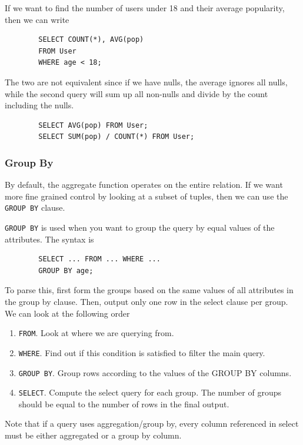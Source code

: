     \begin{example}
      If we want to find the number of users under 18 and their average popularity, then we can write 
      \begin{lstlisting}
        SELECT COUNT(*), AVG(pop) 
        FROM User 
        WHERE age < 18; 
      \end{lstlisting}
    \end{example}

    \begin{example}
      The two are not equivalent since if we have nulls, the average ignores all nulls, while the second query will sum up all non-nulls and divide by the count including the nulls. 
      \begin{lstlisting}
        SELECT AVG(pop) FROM User; 
        SELECT SUM(pop) / COUNT(*) FROM User; 
      \end{lstlisting}
    \end{example}

  \subsubsection{Group By} 

    By default, the aggregate function operates on the entire relation. If we want more fine grained control by looking at a subset of tuples, then we can use the \texttt{GROUP BY} clause. 

    \begin{definition}
      \texttt{GROUP BY} is used when you want to group the query by equal values of the attributes. The syntax is 
      \begin{lstlisting}
        SELECT ... FROM ... WHERE ... 
        GROUP BY age; 
      \end{lstlisting}
      To parse this, first form the groups based on the same values of all attributes in the group by clause. Then, output only one row in the select clause per group. We can look at the following order
      \begin{enumerate}
        \item \texttt{FROM}. Look at where we are querying from. 
        \item \texttt{WHERE}. Find out if this condition is satisfied to filter the main query. 
        \item \texttt{GROUP BY}. Group rows according to the values of the GROUP BY columns. 
        \item \texttt{SELECT}. Compute the select query for each group. The number of groups should be equal to the number of rows in the final output. 
      \end{enumerate}
      Note that if a query uses aggregation/group by, every column referenced in select must be either aggregated or a group by column. 
    \end{definition}

